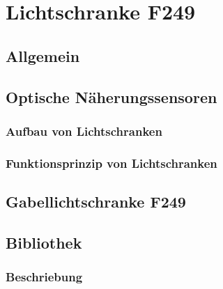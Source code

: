 %
%

\chapter{Lichtschranke F249}
\section{Allgemein}


\section{Optische Näherungssensoren}

\subsection{Aufbau von Lichtschranken}


\subsection{Funktionsprinzip von Lichtschranken}





\section{Gabellichtschranke F249}
\section{Bibliothek}
\subsection{Beschriebung}

